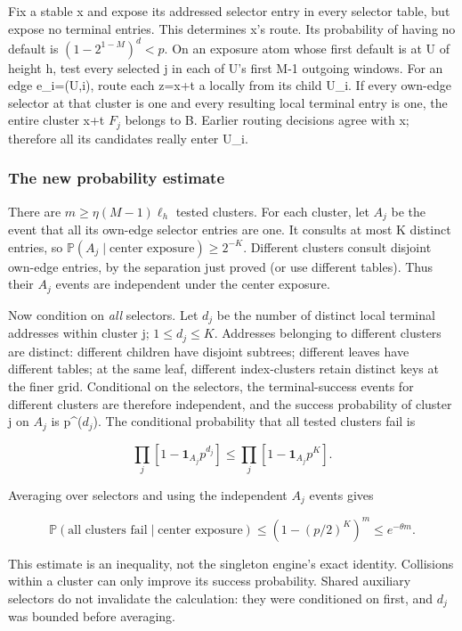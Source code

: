 \documentclass[
  11pt,
]{article}
\theoremstyle{remark}\newtheorem{remark}[theorem]{Remark}
\begin{document}
Fix a stable x and expose its addressed selector entry in every selector
table, but expose no terminal entries. This determines x's route. Its
probability of having no default is \((1-2^{1-M})^d<p\). On an exposure
atom whose first default is at U of height h, test every selected j in
each of U's first M-1 outgoing windows. For an edge e\_i=(U,i), route
each z=x+t a locally from its child U\_i. If every own-edge selector at
that cluster is one and every resulting local terminal entry is one, the
entire cluster x+t \(F_j\) belongs to B. Earlier routing decisions agree
with x; therefore all its candidates really enter U\_i.

\subsubsection{The new probability
estimate}\label{the-new-probability-estimate}

There are \(m\ge\eta(M-1)\ell_h\) tested clusters. For each cluster, let
\(A_j\) be the event that all its own-edge selector entries are one. It
consults at most K distinct entries, so
\(\mathbb P(A_j\mid\text{center exposure})\ge2^{-K}\). Different
clusters consult disjoint own-edge entries, by the separation just
proved (or use different tables). Thus their \(A_j\) events are
independent under the center exposure.

Now condition on \emph{all} selectors. Let \(d_j\) be the number of
distinct local terminal addresses within cluster j; \(1\le d_j\le K\).
Addresses belonging to different clusters are distinct: different
children have disjoint subtrees; different leaves have different tables;
at the same leaf, different index-clusters retain distinct keys at the
finer grid. Conditional on the selectors, the terminal-success events
for different clusters are therefore independent, and the success
probability of cluster j on \(A_j\) is p\^{}(\(d_j\)). The conditional
probability that all tested clusters fail is

\[
\prod_j[1-\mathbf1_{A_j}p^{d_j}]\le\prod_j[1-\mathbf1_{A_j}p^K].
\]

Averaging over selectors and using the independent \(A_j\) events gives

\[
\mathbb P(\text{all clusters fail}\mid\text{center exposure})\le(1-(p/2)^K)^m\le e^{-\theta m}.\tag{2}
\]

This estimate is an inequality, not the singleton engine's exact
identity. Collisions within a cluster can only improve its success
probability. Shared auxiliary selectors do not invalidate the
calculation: they were conditioned on first, and \(d_j\) was bounded
before averaging.
\end{document}
